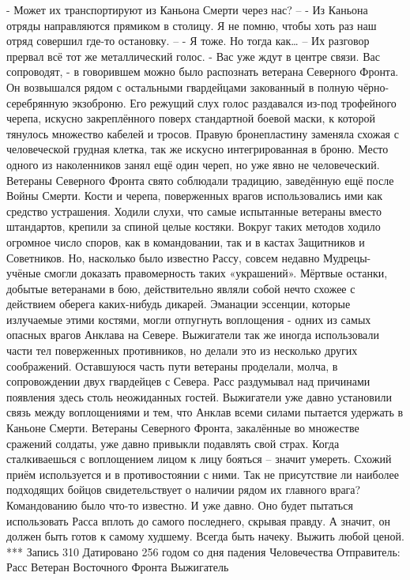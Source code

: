 \documentclass[a4paper, 12pt]{report}
\begin{document}
	- Может их транспортируют из Каньона Смерти через нас? – 
	- Из Каньона отряды направляются прямиком в столицу. Я не помню, чтобы хоть раз наш отряд совершил где-то остановку. – 
	- Я тоже. Но тогда как… –
	Их разговор прервал всё тот же металлический голос.
	- Вас уже ждут в центре связи. Вас сопроводят, - в говорившем можно было распознать ветерана Северного Фронта. Он возвышался рядом с остальными гвардейцами закованный в полную чёрно-серебрянную экзоброню. Его режущий слух голос раздавался из-под трофейного черепа, искусно закреплённого поверх стандартной боевой маски, к которой тянулось множество кабелей и тросов. Правую бронепластину заменяла схожая с человеческой грудная клетка, так же искусно интегрированная в броню. Место одного из наколенников занял ещё один череп, но уже явно не человеческий. 
Ветераны Северного Фронта свято соблюдали традицию, заведённую ещё после Войны Смерти. Кости и черепа, поверженных врагов использовались ими как средство устрашения. Ходили слухи, что самые испытанные ветераны вместо штандартов, крепили за спиной целые костяки. Вокруг таких методов ходило огромное число споров, как в командовании, так и в кастах Защитников и Советников. Но, насколько было известно Рассу, совсем недавно Мудрецы-учёные смогли доказать правомерность таких «украшений». Мёртвые останки, добытые ветеранами в бою, действительно являли собой нечто схожее с действием оберега каких-нибудь дикарей. Эманации эссенции, которые излучаемые этими костями, могли отпугнуть воплощения - одних из самых опасных врагов Анклава на Севере. Выжигатели так же иногда использовали части тел поверженных противников, но делали это из несколько других соображений.
Оставшуюся часть пути ветераны проделали, молча, в сопровождении двух гвардейцев с Севера. Расс раздумывал над причинами появления здесь столь неожиданных гостей. Выжигатели уже давно установили связь между воплощениями и тем, что Анклав всеми силами пытается удержать в Каньоне Смерти. Ветераны Северного Фронта, закалённые во множестве сражений солдаты, уже давно привыкли подавлять свой страх. Когда сталкиваешься с воплощением лицом к лицу бояться – значит умереть. Схожий приём используется и в противостоянии с ними. Так не присутствие ли наиболее подходящих бойцов свидетельствует о наличии рядом их главного врага? Командованию было что-то известно. И уже давно. Оно будет пытаться использовать Расса вплоть до самого последнего, скрывая правду. А значит, он должен быть готов к самому худшему. 
Всегда быть начеку. Выжить любой ценой.
***
Запись 310
Датировано 256 годом со дня падения Человечества
Отправитель: Расс Ветеран Восточного Фронта Выжигатель
\end{document}

